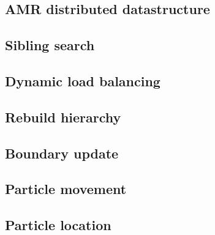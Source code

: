 \documentclass{article}
\begin{document}
\subsection{AMR distributed datastructure} \label{issue:amr}
\subsection{Sibling search}\label{issue:amr-neighbors}
\subsection{Dynamic load balancing} \label{issue:amr-balance}
\subsection{Rebuild hierarchy} \label{issue:amr-rebuild}
\subsection{Boundary update} \label{issue:amr-ghost-update}
\subsection{Particle movement} \label{issue:particle-movement}
\subsection{Particle location} \label{issue:particle-location}
\end{document}
